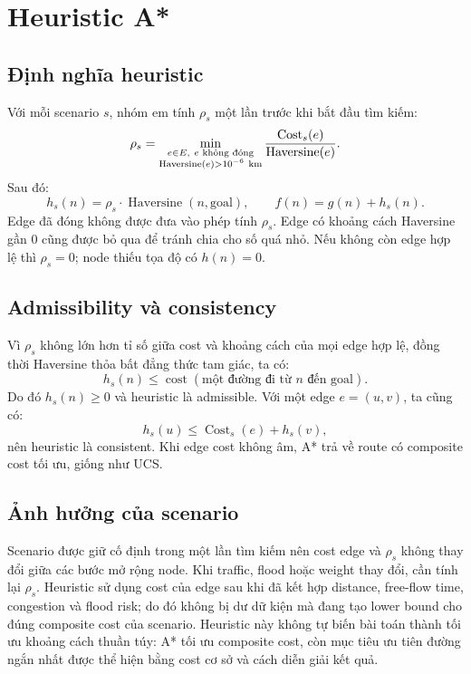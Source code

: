 \section{Heuristic A*}
\subsection{Định nghĩa heuristic}
Với mỗi scenario \(s\), nhóm em tính \(\rho_s\) một lần trước khi bắt đầu tìm kiếm:
\[
\rho_s=\min_{\substack{e\in E,\ e\text{ không đóng}\\
\operatorname{Haversine}(e)>10^{-6}\ {\rm km}}}
\frac{\operatorname{Cost}_s(e)}{\operatorname{Haversine}(e)}.
\]
Sau đó:
\[
h_s(n)=\rho_s\cdot\operatorname{Haversine}(n,\mathrm{goal}),
\qquad f(n)=g(n)+h_s(n).
\]
Edge đã đóng không được đưa vào phép tính \(\rho_s\). Edge có khoảng cách Haversine gần 0 cũng được bỏ qua để tránh chia cho số quá nhỏ. Nếu không còn edge hợp lệ thì \(\rho_s=0\); node thiếu tọa độ có \(h(n)=0\).

\subsection{Admissibility và consistency}
Vì \(\rho_s\) không lớn hơn tỉ số giữa cost và khoảng cách của mọi edge hợp lệ, đồng thời Haversine thỏa bất đẳng thức tam giác, ta có:
\[
h_s(n)\leq \operatorname{cost}(\text{một đường đi từ }n\text{ đến goal}).
\]
Do đó \(h_s(n)\geq0\) và heuristic là admissible. Với một edge \(e=(u,v)\), ta cũng có:
\[
h_s(u)\leq \operatorname{Cost}_s(e)+h_s(v),
\]
nên heuristic là consistent. Khi edge cost không âm, A* trả về route có composite cost tối ưu, giống như UCS.

\subsection{Ảnh hưởng của scenario}
Scenario được giữ cố định trong một lần tìm kiếm nên cost edge và \(\rho_s\) không thay đổi giữa các bước mở rộng node. Khi traffic, flood hoặc weight thay đổi, cần tính lại \(\rho_s\). Heuristic sử dụng cost của edge sau khi đã kết hợp distance, free-flow time, congestion và flood risk; do đó không bị dư dữ kiện mà đang tạo lower bound cho đúng composite cost của scenario. Heuristic này không tự biến bài toán thành tối ưu khoảng cách thuần túy: A* tối ưu composite cost, còn mục tiêu ưu tiên đường ngắn nhất được thể hiện bằng cost cơ sở và cách diễn giải kết quả.
